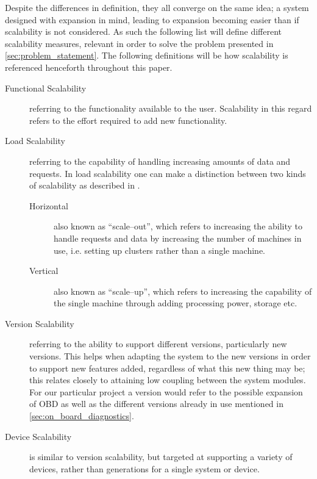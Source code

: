 Despite the differences in definition, they all converge on the same idea; a system designed with expansion in mind, leading to expansion becoming easier than if scalability is not considered.
As such the following list will define different scalability measures, relevant in order to solve the problem presented in \cref{sec:problem_statement}.
The following definitions will be how scalability is referenced henceforth throughout this paper.
\begin{description}
    \item [Functional Scalability]
        referring to the functionality available to the user.
        Scalability in this regard refers to the effort required to add new functionality.
    \item [Load Scalability]
        referring to the capability of handling increasing amounts of data and requests.
        In load scalability one can make a distinction between two kinds of scalability as described in \cite{HoriVertScale}.
        \begin{description}
            \item [Horizontal] also known as ``scale--out'', which refers to increasing the ability to handle requests and data by increasing the number of machines in use, i.e. setting up clusters rather than a single machine.
            \item [Vertical] also known as ``scale--up'', which refers to increasing the capability of the single machine through adding processing power, storage etc.
        \end{description}
    \item [Version Scalability]
        referring to the ability to support different versions, particularly new versions.
        This helps when adapting the system to the new versions in order to support new features added, regardless of what this new thing may be; this relates closely to attaining low coupling between the system modules\cite[p.~266]{coupling}.
        For our particular project a version would refer to the possible expansion of \ac{OBD} as well as the different versions already in use mentioned in \cref{sec:on_board_diagnostics}.
    \item [Device Scalability]
        is similar to version scalability, but targeted at supporting a variety of devices, rather than generations for a single system or device.
\end{description}
